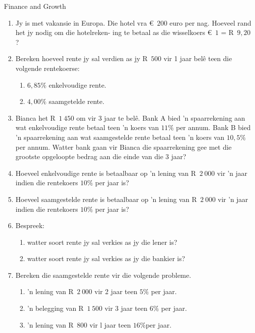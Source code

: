 \begin{eocexercises}{Finance and Growth}
    \begin{enumerate}[label=\textbf{\arabic*}.]
	\item Jy is met vakansie in Europa. Die hotel vra €~$200$ euro per nag. Hoeveel rand het jy nodig om die hotelreken-
ing te betaal as die wisselkoers  €~$1$ = R~$9,20$?

	\item Bereken hoeveel rente jy sal verdien as jy R~$500$ vir 1 jaar belê teen die volgende rentekoerse:
	\begin{enumerate}
	    \item $6,85\%$ enkelvoudige rente.
	    \item $4,00\%$ saamgetelde rente.
	\end{enumerate}

	\item Bianca het R~$1~450$ om vir 3 jaar te belê. Bank A bied ’n spaarrekening aan wat enkelvoudige rente betaal
teen ’n koers van $11\%$ per annum. Bank B bied ’n spaarrekening aan wat saamgestelde rente betaal
teen ’n koers van $10,5\%$ per annum. Watter bank gaan vir Bianca die spaarrekening gee met die grootste
opgeloopte bedrag aan die einde van die 3 jaar?

	\item Hoeveel enkelvoudige rente is betaalbaar op ’n lening van R~$2~000$ vir ’n jaar indien die rentekoers $10\%$ per jaar is?

	\item Hoeveel saamgestelde rente is betaalbaar op ’n lening van  R~$2~000$ vir ’n jaar indien die rentekoers $10\%$ per jaar is?

	\item Bespreek:
	\begin{enumerate}
	    \item watter soort rente jy sal verkies as jy die lener is?

	    \item watter soort rente jy sal verkies as jy die bankier is?
	\end{enumerate}

	\item Bereken die saamgestelde rente vir die volgende probleme.
	\begin{enumerate}
	    \item ’n lening van R~$2~000$ vir 2 jaar teen  $5\%$ per jaar.
	    \item ’n belegging van  R~$1~500$ vir 3 jaar teen $6\%$ per jaar.
	    \item ’n lening van R~$800$ vir l jaar teen $16\%$per jaar.
	\end{enumerate}


\end{enumerate}
\end{eocexercises}

